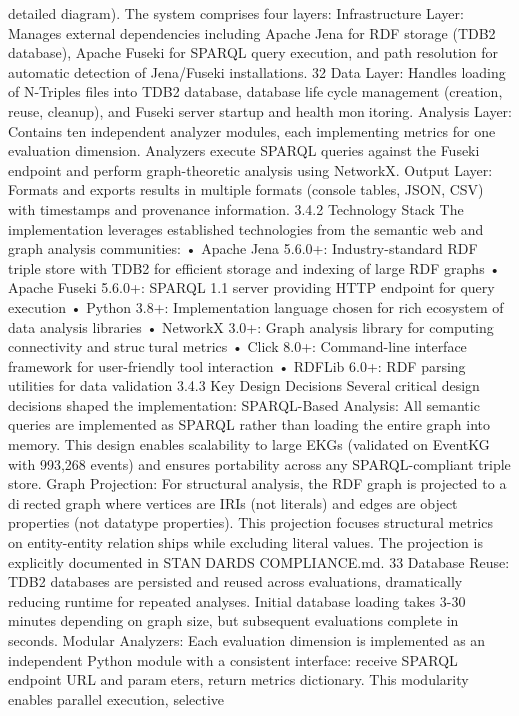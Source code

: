 detailed diagram).
The system comprises four layers:
Infrastructure Layer: Manages external dependencies including Apache Jena for
RDF storage (TDB2 database), Apache Fuseki for SPARQL query execution, and path
resolution for automatic detection of Jena/Fuseki installations.
32
Data Layer: Handles loading of N-Triples files into TDB2 database, database lifecycle management (creation, reuse, cleanup), and Fuseki server startup and health monitoring.
Analysis Layer: Contains ten independent analyzer modules, each implementing
metrics for one evaluation dimension. Analyzers execute SPARQL queries against the
Fuseki endpoint and perform graph-theoretic analysis using NetworkX.
Output Layer: Formats and exports results in multiple formats (console tables,
JSON, CSV) with timestamps and provenance information.
3.4.2 Technology Stack
The implementation leverages established technologies from the semantic web and graph
analysis communities:
• Apache Jena 5.6.0+: Industry-standard RDF triple store with TDB2 for efficient
storage and indexing of large RDF graphs
• Apache Fuseki 5.6.0+: SPARQL 1.1 server providing HTTP endpoint for query
execution
• Python 3.8+: Implementation language chosen for rich ecosystem of data analysis
libraries
• NetworkX 3.0+: Graph analysis library for computing connectivity and structural metrics
• Click 8.0+: Command-line interface framework for user-friendly tool interaction
• RDFLib 6.0+: RDF parsing utilities for data validation
3.4.3 Key Design Decisions
Several critical design decisions shaped the implementation:
SPARQL-Based Analysis: All semantic queries are implemented as SPARQL
rather than loading the entire graph into memory. This design enables scalability to
large EKGs (validated on EventKG with 993,268 events) and ensures portability across
any SPARQL-compliant triple store.
Graph Projection: For structural analysis, the RDF graph is projected to a directed graph where vertices are IRIs (not literals) and edges are object properties (not
datatype properties). This projection focuses structural metrics on entity-entity relationships while excluding literal values. The projection is explicitly documented in STANDARDS COMPLIANCE.md.
33
Database Reuse: TDB2 databases are persisted and reused across evaluations,
dramatically reducing runtime for repeated analyses. Initial database loading takes 3-30
minutes depending on graph size, but subsequent evaluations complete in seconds.
Modular Analyzers: Each evaluation dimension is implemented as an independent
Python module with a consistent interface: receive SPARQL endpoint URL and parameters, return metrics dictionary. This modularity enables parallel execution, selective
